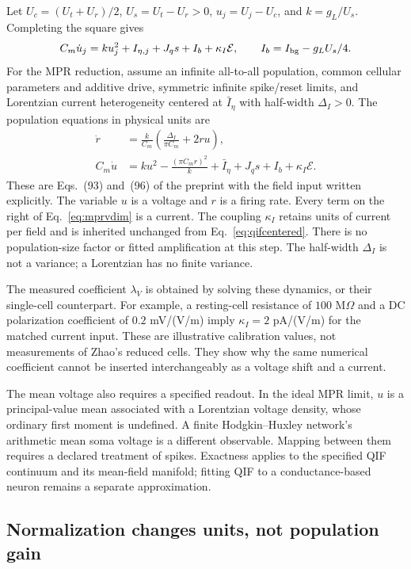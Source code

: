 \documentclass[11pt,a4paper]{article}
\newcommand{\E}{\mathcal E}
\begin{document}
Let $U_c=(U_t+U_r)/2$, $U_s=U_t-U_r>0$, $u_j=U_j-U_c$, and $k=g_L/U_s$. Completing the square gives
\begin{equation}
C_m\dot u_j=ku_j^2+I_{\eta,j}+J_qs+I_b+\kappa_I\E,
\qquad I_b=I_{\rm bg}-g_LU_s/4.
\label{eq:qifcentered}
\end{equation}
For the MPR reduction, assume an infinite all-to-all population, common cellular parameters and additive drive, symmetric infinite spike/reset limits, and Lorentzian current heterogeneity centered at $\bar I_\eta$ with half-width $\Delta_I>0$. The population equations in physical units are~\cite{ruffini,mpr}
\begin{align}
\dot r&=\frac{k}{C_m}\left(\frac{\Delta_I}{\pi C_m}+2ru\right),
\label{eq:mprrdim}\\
C_m\dot u&=ku^2-\frac{(\pi C_mr)^2}{k}
+\bar I_\eta+J_qs+I_b+\kappa_I\E.
\label{eq:mprvdim}
\end{align}
These are Eqs.~(93) and~(96) of the preprint with the field input written explicitly. The variable $u$ is a voltage and $r$ is a firing rate. Every term on the right of Eq.~\eqref{eq:mprvdim} is a current. The coupling $\kappa_I$ retains units of current per field and is inherited unchanged from Eq.~\eqref{eq:qifcentered}. There is no population-size factor or fitted amplification at this step. The half-width $\Delta_I$ is not a variance; a Lorentzian has no finite variance.

The measured coefficient $\lambda_V$ is obtained by solving these dynamics, or their single-cell counterpart. For example, a resting-cell resistance of $100$ M$\Omega$ and a DC polarization coefficient of $0.2$ mV/(V/m) imply $\kappa_I=2$ pA/(V/m) for the matched current input. These are illustrative calibration values, not measurements of Zhao's reduced cells. They show why the same numerical coefficient cannot be inserted interchangeably as a voltage shift and a current.

The mean voltage also requires a specified readout. In the ideal MPR limit, $u$ is a principal-value mean associated with a Lorentzian voltage density, whose ordinary first moment is undefined. A finite Hodgkin--Huxley network's arithmetic mean soma voltage is a different observable. Mapping between them requires a declared treatment of spikes. Exactness applies to the specified QIF continuum and its mean-field manifold; fitting QIF to a conductance-based neuron remains a separate approximation.

\subsection{Normalization changes units, not population gain}
\end{document}
